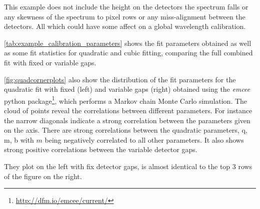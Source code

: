 This example does not include the height on the detectors the spectrum falls or any skewness of the spectrum to pixel rows or any miss-alignment between the detectors.
All which could have some affect on a global wavelength calibration.

\cref{tab:example_calibration_parameters} shows the fit parameters obtained as well as some fit statistics for quadratic and cubic fitting, comparing the full combined fit with fixed or variable gaps.

\cref{fig:quadcornerplots} also show the distribution of the fit parameters for the quadratic fit with fixed (left) and variable gaps (right) obtained using the \textit{emcee} python package\footnote{\href{http://dfm.io/emcee/current/}{http://dfm.io/emcee/current/}}, which performs a Markov chain Monte Carlo simulation.
The cloud of points reveal the correlations between different parameters.
For instance the narrow diagonals indicate a strong correlation between the parameters given on the axis.
There are strong correlations between the quadratic parameters, {q, m, b} with $m$ being negatively correlated to all other parameters.
It also shows strong positive correlations between the variable detector gaps.

They plot on the left with fix detector gaps, is almost identical to the top 3 rows of the figure on the right.




